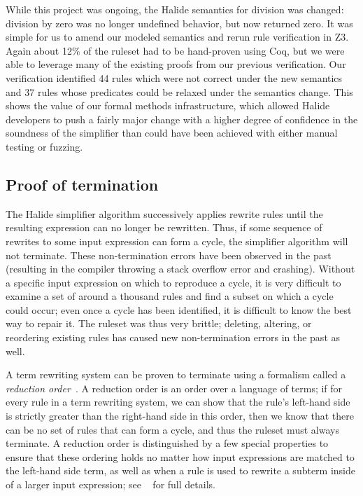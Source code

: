 While this project was ongoing, the Halide semantics for division was changed: division by zero was no longer undefined behavior, but now returned zero. It was simple for us to amend our modeled semantics and rerun rule verification in Z3. Again about 12\% of the ruleset had to be hand-proven using Coq, but we were able to leverage many of the existing proofs from our previous verification. Our verification identified 44 rules which were not correct under the new semantics and 37 rules whose predicates could be relaxed under the semantics change. This shows the value of our formal methods infrastructure, which allowed Halide developers to push a fairly major change with a higher degree of confidence in the soundness of the simplifier than could have been achieved with either manual testing or fuzzing.

\subsection{Proof of termination}
The Halide simplifier algorithm successively applies rewrite rules until the resulting expression can no longer be rewritten. Thus, if some sequence of rewrites to some input expression can form a cycle, the simplifier algorithm will not terminate. These non-termination errors have been observed in the past (resulting in the compiler throwing a stack overflow error and crashing). Without a specific input expression on which to reproduce a cycle, it is very difficult to examine a set of around a thousand rules and find a subset on which a cycle could occur; even once a cycle has been identified, it is difficult to know the best way to repair it. The ruleset was thus very brittle; deleting, altering, or reordering existing rules has caused new non-termination errors in the past as well.

A term rewriting system can be proven to terminate using a formalism called a \emph{reduction order}~\citep{baader1999term}. A reduction order is an order over a language of terms; if for every rule in a term rewriting system, we can show that the rule's left-hand side is strictly greater than the right-hand side in this order, then we know that there can be no set of rules that can form a cycle, and thus the ruleset must always terminate. A reduction order is distinguished by a few special properties to ensure that these ordering holds no matter how input expressions are matched to the left-hand side term, as well as when a rule is used to rewrite a subterm inside of a larger input expression; see ~\citep{newcomb2020verifying} for full details.

